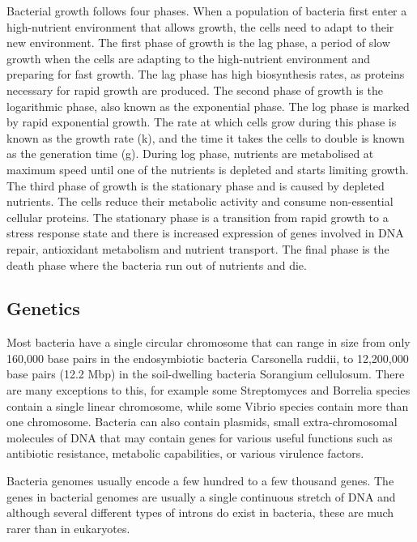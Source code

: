 Bacterial growth follows four phases. When a population of bacteria first enter a high-nutrient environment that allows growth, the cells need to adapt to their new environment. The first phase of growth is the lag phase, a period of slow growth when the cells are adapting to the high-nutrient environment and preparing for fast growth. The lag phase has high biosynthesis rates, as proteins necessary for rapid growth are produced. The second phase of growth is the logarithmic phase, also known as the exponential phase. The log phase is marked by rapid exponential growth. The rate at which cells grow during this phase is known as the growth rate (k), and the time it takes the cells to double is known as the generation time (g). During log phase, nutrients are metabolised at maximum speed until one of the nutrients is depleted and starts limiting growth. The third phase of growth is the stationary phase and is caused by depleted nutrients. The cells reduce their metabolic activity and consume non-essential cellular proteins. The stationary phase is a transition from rapid growth to a stress response state and there is increased expression of genes involved in DNA repair, antioxidant metabolism and nutrient transport. The final phase is the death phase where the bacteria run out of nutrients and die.

\hypertarget{genetics-1}{%
\subsection{Genetics}\label{genetics-1}}

Most bacteria have a single circular chromosome that can range in size from only 160,000 base pairs in the endosymbiotic bacteria Carsonella ruddii, to 12,200,000 base pairs (12.2 Mbp) in the soil-dwelling bacteria Sorangium cellulosum. There are many exceptions to this, for example some Streptomyces and Borrelia species contain a single linear chromosome, while some Vibrio species contain more than one chromosome. Bacteria can also contain plasmids, small extra-chromosomal molecules of DNA that may contain genes for various useful functions such as antibiotic resistance, metabolic capabilities, or various virulence factors.

Bacteria genomes usually encode a few hundred to a few thousand genes. The genes in bacterial genomes are usually a single continuous stretch of DNA and although several different types of introns do exist in bacteria, these are much rarer than in eukaryotes.

